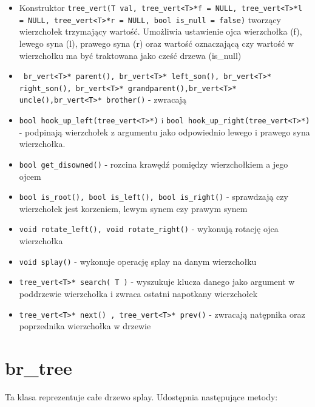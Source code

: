 \documentclass[declaration,shortabstract]{iithesis}
\theoremstyle{thm}
\theoremstyle{remark}
\theoremstyle{plain}
\theoremstyle{plain}
\theoremstyle{plain}
\begin{document}
\begin{itemize}

\item{Konstruktor \texttt{tree\_vert(T val, tree\_vert<T>*f = NULL, tree\_vert<T>*l = NULL, tree\_vert<T>*r = NULL, bool is\_null = false)} tworzący wierzchołek trzymający wartość. Umożliwia ustawienie ojca wierzchołka (f), lewego syna (l), prawego syna (r) oraz wartość oznaczającą czy wartość w wierzchołku ma być traktowana jako cześć drzewa (is\_null)}

\item{\texttt{ br\_vert<T>* parent(), br\_vert<T>* left\_son(), br\_vert<T>* right\_son(), br\_vert<T>* grandparent(),br\_vert<T>* uncle(),br\_vert<T>* brother()} - zwracają }
    
\item{\texttt{bool hook\_up\_left(tree\_vert<T>*)} i \texttt{bool hook\_up\_right(tree\_vert<T>*)} - podpinają wierzchołek z argumentu jako odpowiednio lewego i prawego syna wierzchołka.}

\item{\texttt{bool get\_disowned()} - rozcina krawędź pomiędzy wierzchołkiem a jego ojcem}

\item{\texttt{bool is\_root(), bool is\_left(),  bool is\_right()} - sprawdzają czy wierzchołek jest korzeniem, lewym synem czy prawym synem}

\item{\texttt{void rotate\_left(), void rotate\_right()} - wykonują rotację ojca wierzchołka}
    
\item{\texttt{void splay()} - wykonuje operację splay na danym wierzchołku}
    
\item{\texttt{tree\_vert<T>* search( T )} - wyszukuje klucza danego jako argument w poddrzewie wierzchołka i zwraca ostatni napotkany wierzchołek}
   
\item{\texttt{tree\_vert<T>* next() ,  tree\_vert<T>* prev()} - zwracają natępnika oraz poprzednika wierzchołka w drzewie}
\end{itemize}

\section{br\_tree}

Ta klasa reprezentuje całe drzewo splay. Udostępnia następujące metody: 
\end{document}
